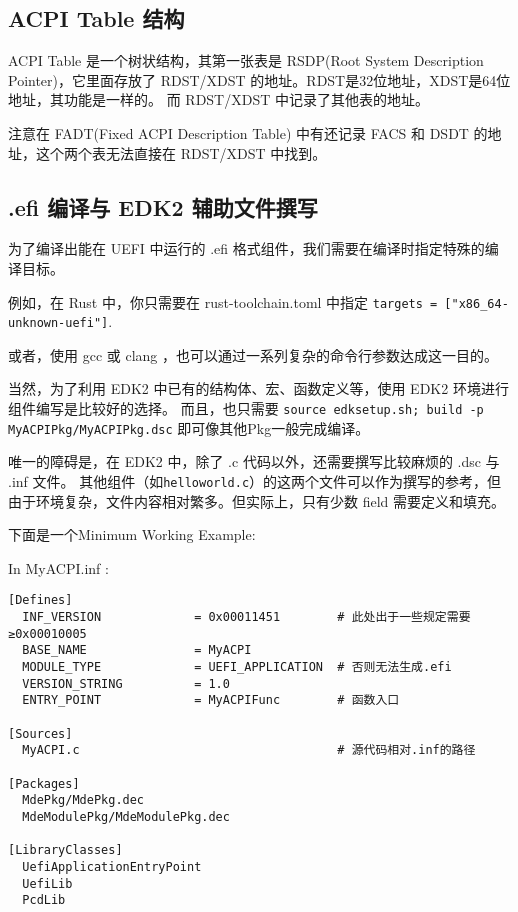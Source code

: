 \subsection{ACPI Table 结构}

ACPI Table 是一个树状结构，其第一张表是 RSDP(Root System Description Pointer)，它里面存放了 RDST/XDST 的地址。RDST是32位地址，XDST是64位地址，其功能是一样的。
而 RDST/XDST 中记录了其他表的地址。

注意在 FADT(Fixed ACPI Description Table) 中有还记录 FACS 和 DSDT 的地址，这个两个表无法直接在 RDST/XDST 中找到。

\subsection{.efi 编译与 EDK2 辅助文件撰写}
为了编译出能在 UEFI 中运行的 .efi 格式组件，我们需要在编译时指定特殊的编译目标。

例如，在 Rust 中，你只需要在 rust-toolchain.toml 中指定
\texttt{targets = ["x86\_64-unknown-uefi"]}.

或者，使用 gcc 或 clang ，也可以通过一系列复杂的命令行参数达成这一目的。

当然，为了利用 EDK2 中已有的结构体、宏、函数定义等，使用 EDK2 环境进行组件编写是比较好的选择。
而且，也只需要 \texttt{source edksetup.sh; build -p MyACPIPkg/MyACPIPkg.dsc} 即可像其他Pkg一般完成编译。

唯一的障碍是，在 EDK2 中，除了 .c 代码以外，还需要撰写比较麻烦的 .dsc 与 .inf 文件。
其他组件（如\texttt{helloworld.c}）的这两个文件可以作为撰写的参考，但由于环境复杂，文件内容相对繁多。但实际上，只有少数 field 需要定义和填充。

下面是一个Minimum Working Example: 

In MyACPI.inf :

\begin{lstlisting}
[Defines]
  INF_VERSION             = 0x00011451        # 此处出于一些规定需要≥0x00010005
  BASE_NAME               = MyACPI
  MODULE_TYPE             = UEFI_APPLICATION  # 否则无法生成.efi
  VERSION_STRING          = 1.0
  ENTRY_POINT             = MyACPIFunc        # 函数入口

[Sources]
  MyACPI.c                                    # 源代码相对.inf的路径

[Packages]
  MdePkg/MdePkg.dec
  MdeModulePkg/MdeModulePkg.dec

[LibraryClasses]
  UefiApplicationEntryPoint
  UefiLib
  PcdLib
\end{lstlisting}

